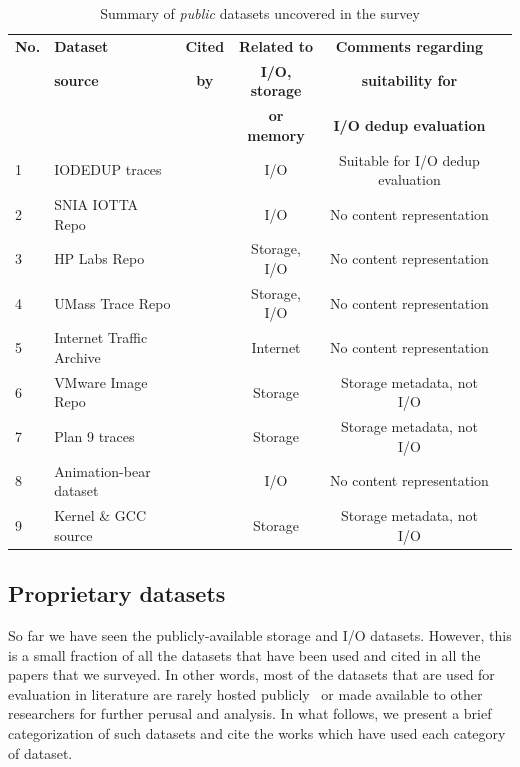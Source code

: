 \begin{table} [t]
	\begin{tabular}{|l|l|c|c|c|l|} \hline
	\textbf{No.} & \textbf{Dataset} & \textbf{Cited} & \textbf{Related to} & \textbf{Comments regarding} \\
	\textbf{} & \textbf{source} & \textbf{by} & \textbf{I/O, storage} & \textbf{suitability for} \\
	\textbf{} & \textbf{} & \textbf{} & \textbf{or memory} & \textbf{I/O dedup evaluation} \\ \hline
	1 & IODEDUP traces & \cite{iodedup} & I/O & Suitable for I/O dedup evaluation \\ 
	2 & SNIA IOTTA Repo & \cite{flexi-replay, winservers, metadata-evolution, tracefs} & I/O & No content representation \\ 
	3 & HP Labs Repo & \cite{storage-system-security, hplabs-repo} & Storage, I/O & No content representation \\
	4 & UMass Trace Repo & \cite{flexi-replay, intradisk-parallelism, memorybuddies} & Storage, I/O & No content representation \\
	5 & Internet Traffic Archive & \cite{failure-of-poisson, search-for-invariants, ita-repo} & Internet & No content representation \\
	6 & VMware Image Repo & \cite{p-dedupe, ddelta} & Storage & Storage metadata, not I/O \\
	7 & Plan 9 traces & \cite{venti} & Storage & Storage metadata, not I/O \\
	8 & Animation-bear dataset & \cite{animation-bear} & I/O & No content representation \\ 
	9 & Kernel \& GCC source & \cite{p-dedupe, ddelta} & Storage & Storage metadata, not I/O \\ \hline
	\end{tabular}
	\caption{Summary of \textit{public} datasets uncovered in the survey}
	\label{tab:public-listed}
\end{table}

\subsection{Proprietary datasets}
So far we have seen the publicly-available storage and I/O datasets. However,
this is a small fraction of all the datasets that have been used and cited
in all the papers that we surveyed. In other words, most of the datasets that
are used for evaluation in literature are rarely hosted 
publicly~\cite{generating-datasets} or made
available to other researchers for further perusal and analysis. In what
follows, we present a brief categorization of such datasets and cite the
works which have used each category of dataset.

